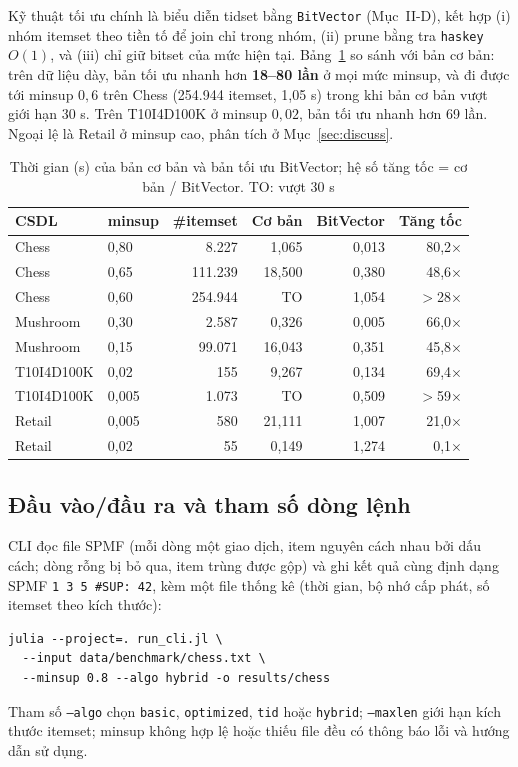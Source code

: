 \documentclass[10pt,twocolumn,letterpaper]{article}
\begin{document}
Kỹ thuật tối ưu chính là biểu diễn tidset bằng \texttt{BitVector} (Mục~II-D), kết hợp (i) nhóm itemset theo tiền tố để join chỉ trong nhóm, (ii) prune bằng tra \texttt{haskey} $O(1)$, và (iii) chỉ giữ bitset của mức hiện tại. Bảng~\ref{tab:speedup} so sánh với bản cơ bản: trên dữ liệu dày, bản tối ưu nhanh hơn \textbf{18–80 lần} ở mọi mức minsup, và đi được tới minsup $0{,}6$ trên Chess (254{.}944 itemset, 1,05 s) trong khi bản cơ bản vượt giới hạn 30 s. Trên T10I4D100K ở minsup $0{,}02$, bản tối ưu nhanh hơn 69 lần. Ngoại lệ là Retail ở minsup cao, phân tích ở Mục~\ref{sec:discuss}.

\begin{table}[t]
\centering
\caption{Thời gian (s) của bản cơ bản và bản tối ưu BitVector; hệ số tăng tốc = cơ bản / BitVector. TO: vượt 30 s}
\label{tab:speedup}
\footnotesize
\begin{tabular}{@{}llrrrr@{}}
\toprule
CSDL & minsup & \#itemset & Cơ bản & BitVector & Tăng tốc \\ \midrule
Chess & 0,80 & 8{.}227 & 1,065 & 0,013 & 80,2$\times$ \\
Chess & 0,65 & 111{.}239 & 18,500 & 0,380 & 48,6$\times$ \\
Chess & 0,60 & 254{.}944 & TO & 1,054 & $>$28$\times$ \\
Mushroom & 0,30 & 2{.}587 & 0,326 & 0,005 & 66,0$\times$ \\
Mushroom & 0,15 & 99{.}071 & 16,043 & 0,351 & 45,8$\times$ \\
T10I4D100K & 0,02 & 155 & 9,267 & 0,134 & 69,4$\times$ \\
T10I4D100K & 0,005 & 1{.}073 & TO & 0,509 & $>$59$\times$ \\
Retail & 0,005 & 580 & 21,111 & 1,007 & 21,0$\times$ \\
Retail & 0,02 & 55 & 0,149 & 1,274 & 0,1$\times$ \\
\bottomrule
\end{tabular}
\end{table}

\subsection{Đầu vào/đầu ra và tham số dòng lệnh}
CLI đọc file SPMF (mỗi dòng một giao dịch, item nguyên cách nhau bởi dấu cách; dòng rỗng bị bỏ qua, item trùng được gộp) và ghi kết quả cùng định dạng SPMF \texttt{1 3 5 \#SUP: 42}, kèm một file thống kê (thời gian, bộ nhớ cấp phát, số itemset theo kích thước):
\begin{verbatim}
julia --project=. run_cli.jl \
  --input data/benchmark/chess.txt \
  --minsup 0.8 --algo hybrid -o results/chess
\end{verbatim}
\noindent Tham số \texttt{--algo} chọn \texttt{basic}, \texttt{optimized}, \texttt{tid} hoặc \texttt{hybrid}; \texttt{--maxlen} giới hạn kích thước itemset; minsup không hợp lệ hoặc thiếu file đều có thông báo lỗi và hướng dẫn sử dụng.
\end{document}
